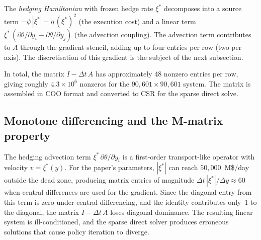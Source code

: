 The \emph{hedging Hamiltonian} with frozen hedge rate $\xi^*$ decomposes into a source term $-\psi\,|\xi^*| - \eta\,(\xi^*)^2$ (the execution cost) and a linear term $\xi^*\,(\partial\theta/\partial y_i - \partial\theta/\partial y_j)$ (the advection coupling). The advection term contributes to $A$ through the gradient stencil, adding up to four entries per row (two per axis). The discretisation of this gradient is the subject of the next subsection.

In total, the matrix $I - \Delta t\,A$ has approximately 48 nonzero entries per row, giving roughly $4.3 \times 10^6$ nonzeros for the $90{,}601 \times 90{,}601$ system. The matrix is assembled in COO format and converted to CSR for the sparse direct solve.


\subsection{Monotone differencing and the M-matrix property}
\label{sec:pde-monotone}

The hedging advection term $\xi^*\,\partial\theta/\partial y_i$ is a first-order transport-like operator with velocity $v = \xi^*(y)$. For the paper's parameters, $|\xi^*|$ can reach $50{,}000$~M\$/day outside the dead zone, producing matrix entries of magnitude $\Delta t\,|\xi^*|/\Delta y \approx 60$ when central differences are used for the gradient. Since the diagonal entry from this term is zero under central differencing, and the identity contributes only~1 to the diagonal, the matrix $I - \Delta t\,A$ loses diagonal dominance. The resulting linear system is ill-conditioned, and the sparse direct solver produces erroneous solutions that cause policy iteration to diverge.

